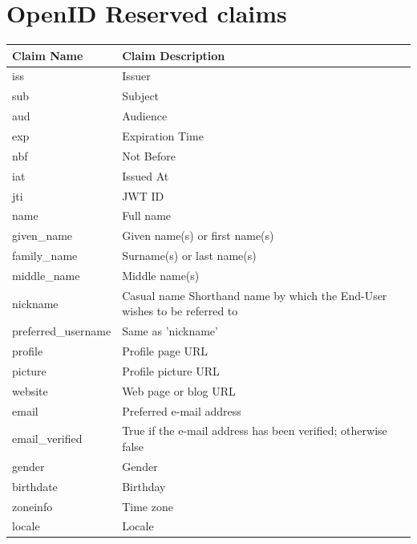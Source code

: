 \documentclass[11pt]{style}
\begin{document}
\section{OpenID Reserved claims}
{
    \setlength\LTleft{-1cm}%
    \setlength\LTright{-1in}%
    \begin{longtable}{||l|l|}
        \hline
        Claim Name             & Claim Description \\
        \hline
        \hline
        iss                  & Issuer \\
        sub                      & Subject \\
        aud                      & Audience \\
        exp                      & Expiration Time \\
        nbf                      & Not Before \\
        iat                      & Issued At \\
        jti                      & JWT ID \\
        name                     & Full name\\
        given\_name                & Given name(s) or first name(s)\\
        family\_name               & Surname(s) or last name(s)\\
        middle\_name               & Middle name(s)\\
        nickname                  & Casual name Shorthand name by which the End-User wishes to be referred to\\
        preferred\_username        & Same as 'nickname'\\
        profile                   & Profile page URL\\
        picture                   & Profile picture URL\\
        website                   & Web page or blog URL\\
        email                     & Preferred e-mail address\\
        email\_verified            & True if the e-mail address has been verified; otherwise false\\
        gender                    & Gender\\
        birthdate                 & Birthday\\
        zoneinfo                  & Time zone\\
        locale                    & Locale\\

\end{longtable}}
\end{document}
